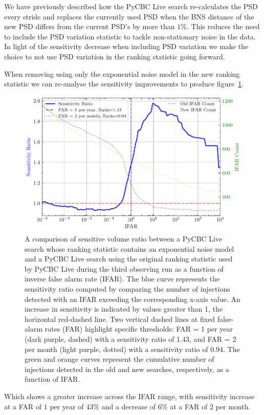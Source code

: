 We have previously described how the PyCBC Live search re-calculates the PSD every stride and replaces the currently used PSD when the BNS distance of the new PSD differs from the current PSD's by more than $1\%$. This reduces the need to include the PSD variation statistic to tackle non-stationary noise in the data. In light of the sensitivity decrease when including PSD variation we make the choice to not use PSD variation in the ranking statistic going forward.

When removing using only the exponential noise model in the new ranking statistic we can re-analyse the sensitivity improvements to produce figure~\ref{5:fig:vt-ratio-fits-only}.
%
\begin{figure}
       \centering
    \includegraphics[width=1.0\textwidth]{images/5_pycbclive/fits-only/fits_only_vt_ratio_with_counts.pdf}
    \caption{A comparison of sensitive volume ratio between a PyCBC Live search whose ranking statistic contains an exponential noise model and a PyCBC Live search using the original ranking statistic used by PyCBC Live during the third observing run as a function of inverse false alarm rate (IFAR). The blue curve represents the sensitivity ratio computed by comparing the number of injections detected with an IFAR exceeding the corresponding x-axis value. An increase in sensitivity is indicated by values greater than 1, the horizontal red-dashed line. Two vertical dashed lines at fixed false-alarm rates (FAR) highlight specific thresholds: FAR = 1 per year (dark purple, dashed) with a sensitivity ratio of 1.43, and FAR = 2 per month (light purple, dotted) with a sensitivity ratio of 0.94. The green and orange curves represent the cumulative number of injections detected in the old and new searches, respectively, as a function of IFAR.}
    \label{5:fig:vt-ratio-fits-only}
\end{figure}
%
Which shows a greater increase across the IFAR range, with sensitivity increase at a FAR of $1$ per year of $43\%$ and a decrease of $6\%$ at a FAR of $2$ per month.


